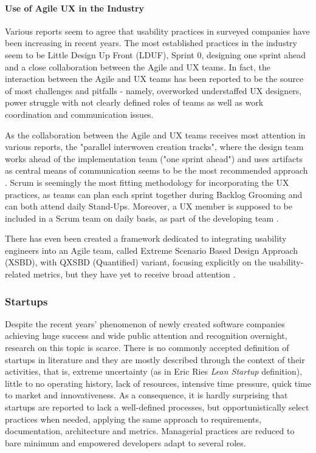 \documentclass{article}
\begin{document}
\paragraph{Use of Agile UX in the Industry}
Various reports seem to agree that usability practices in surveyed companies have been increasing in recent years. The most established practices in the industry seem to be Little Design Up Front (LDUF), Sprint 0, designing one sprint ahead and a close collaboration between the Agile and UX teams. In fact, the interaction between the Agile and UX teams has been reported to be the source of most challenges and pitfalls - namely, overworked understaffed UX designers, power struggle with not clearly defined roles of teams as well as work coordination and communication issues. \cite{salah2014systematic}\cite{jurca2014integrating}

As the collaboration between the Agile and UX teams receives most attention in various reports, the "parallel interwoven creation tracks", where the design team works ahead of the implementation team ("one sprint ahead") and uses artifacts as central means of communication seems to be the most recommended approach \cite{brhel2015exploring}. Scrum is seemingly the most fitting methodology for incorporating the UX practices, as teams can plan each sprint together during Backlog Grooming and can both attend daily Stand-Ups. Moreover, a UX member is supposed to be included in a Scrum team on daily basis, as part of the developing team \cite{ovad2015prevalence}.

There has even been created a framework dedicated to integrating usability engineers into an Agile team, called Extreme Scenario Based Design Approach (XSBD), with QXSBD (Quantified) variant, focusing explicitly on the usability-related metrics, but they have yet to receive broad attention \cite{jurca2014integrating}.

\subsubsection{Startups}
Despite the recent years' phenomenon of newly created software companies achieving huge success and wide public attention and recognition overnight, research on this topic is scarce. There is no commonly accepted definition of startups in literature and they are mostly described through the context of their activities, that is, extreme uncertainty (as in Eric Ries \textit{Lean Startup} \cite{ries2011lean} definition), little to no operating history, lack of resources, intensive time pressure, quick time to market and innovativeness. As a consequence, it is hardly surprising that startups are reported to lack a well-defined processes, but opportunistically select practices when needed, applying the same approach to requirements, documentation, architecture and metrics. Managerial practices are reduced to bare minimum and empowered developers adapt to several roles. \cite{paternoster2014software}
\end{document}
